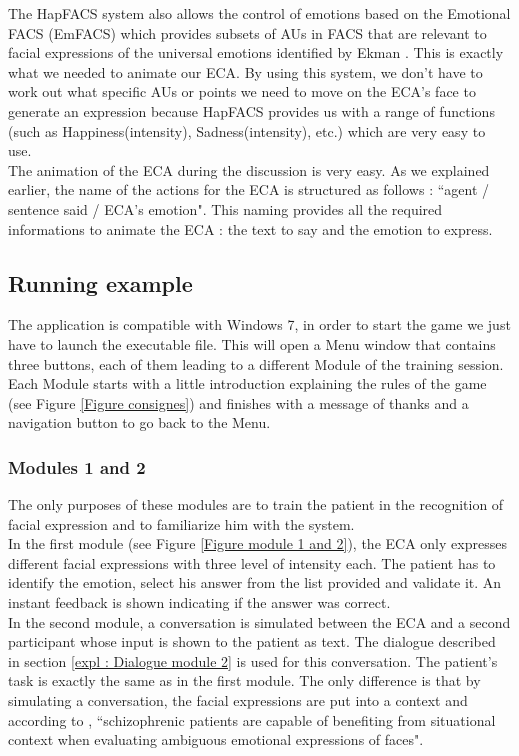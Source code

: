 \documentclass[11pt]{article}
\begin{document}
The HapFACS system also allows the control of emotions based on the Emotional FACS (EmFACS) \citep{Friesen83} which provides subsets of AUs in FACS that are relevant to facial expressions of the universal emotions identified by Ekman \citep{Ekman77}. This is exactly what we needed to animate our ECA. By using this system, we don't have to work out what specific AUs or points we need to move on the ECA's face to generate an expression because HapFACS provides us with a range of functions (such as Happiness(intensity), Sadness(intensity), etc.) which are very easy to use. \\

The animation of the ECA during the discussion is very easy. As we explained earlier, the name of the actions for the ECA is structured as follows : ``agent / sentence said / ECA's emotion". This naming provides all the required informations to animate the ECA : the text to say and the emotion to express. \\
\subsection{Running example}
The application is compatible with Windows 7, in order to start the game we just have to launch the executable file. This will open a Menu window that contains three buttons, each of them leading to a different Module of the training session. \\

Each Module starts with a little introduction explaining the rules of the game (see Figure \ref{Figure consignes}) and finishes with a message of thanks and a navigation button to go back to the Menu.
\subsubsection{Modules 1 and 2}
The only purposes of these modules are to train the patient in the recognition of facial expression and to familiarize him with the system. \\

In the first module (see Figure \ref{Figure module 1 and 2}), the ECA only expresses different facial expressions with three level of intensity each. The patient has to identify the emotion, select his answer from the list provided and validate it. An instant feedback is shown indicating if the answer was correct. \\

In the second module, a conversation is simulated between the ECA and a second participant whose input is shown to the patient as text. The dialogue described in section \ref{expl : Dialogue module 2} is used for this conversation. The patient's task is exactly the same as in the first module. The only difference is that by simulating a conversation, the facial expressions are put into a context and according to \citep{Lee13}, ``schizophrenic patients are capable of benefiting from situational context when evaluating ambiguous emotional expressions of faces".
\end{document}
